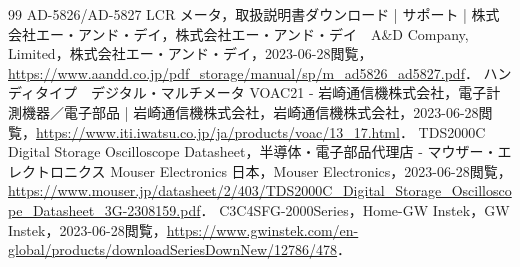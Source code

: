 \documentclass[uplatex,dvipdfmx,a4paper,10pt]{jsarticle}
\begin{document}


\begin{thebibliography}{99}
     AD-5826/AD-5827 LCR メータ，取扱説明書ダウンロード | サポート | 株式会社エー・アンド・デイ，株式会社エー・アンド・デイ　A\&D Company, Limited，株式会社エー・アンド・デイ，2023-06-28閲覧，\url{https://www.aandd.co.jp/pdf_storage/manual/sp/m_ad5826_ad5827.pdf}．
     ハンディタイプ　デジタル・マルチメータ VOAC21 - 岩崎通信機株式会社，電子計測機器／電子部品 | 岩崎通信機株式会社，岩崎通信機株式会社，2023-06-28閲覧，\url{https://www.iti.iwatsu.co.jp/ja/products/voac/13_17.html}．
     TDS2000C Digital Storage Oscilloscope Datasheet，半導体・電子部品代理店 - マウザー・エレクトロニクス Mouser Electronics 日本，Mouser Electronics，2023-06-28閲覧，\url{https://www.mouser.jp/datasheet/2/403/TDS2000C_Digital_Storage_Oscilloscope_Datasheet_3G-2308159.pdf}．
     C3C4SFG-2000Series，Home-GW Instek，GW Instek，2023-06-28閲覧，\url{https://www.gwinstek.com/en-global/products/downloadSeriesDownNew/12786/478}．
\end{thebibliography}
\end{document}
